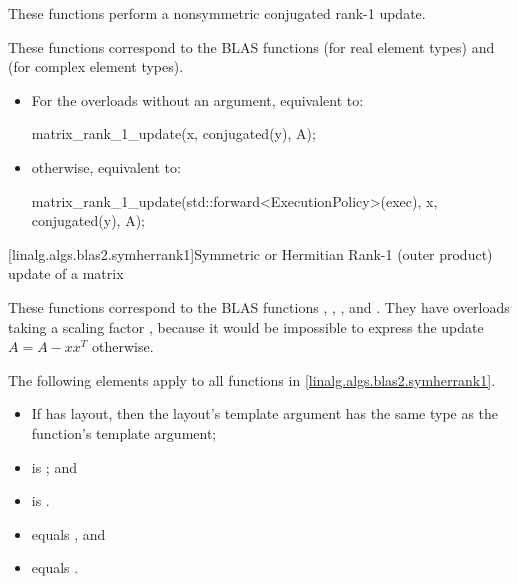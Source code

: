 \begin{itemdescr}
\pnum
These functions perform a nonsymmetric conjugated rank-1 update.
\begin{note}
These functions correspond to the BLAS functions
 (for real element types) and
 (for complex element types).
\end{note}

\pnum
\effects
\begin{itemize}
\item
For the overloads without an  argument,
equivalent to:
\begin{codeblock}
matrix_rank_1_update(x, conjugated(y), A);
\end{codeblock}
\item
otherwise, equivalent to:
\begin{codeblock}
matrix_rank_1_update(std::forward<ExecutionPolicy>(exec), x, conjugated(y), A);
\end{codeblock}
\end{itemize}
\end{itemdescr}

[linalg.algs.blas2.symherrank1]{Symmetric or Hermitian Rank-1 (outer product) update of a matrix}

\pnum
\begin{note}
These functions correspond to the BLAS functions
, , , and .
They have overloads taking a scaling factor ,
because it would be impossible to express the update
$A = A - x x^T$ otherwise.
\end{note}

\pnum
The following elements apply to all functions in \ref{linalg.algs.blas2.symherrank1}.

\pnum
\mandates
\begin{itemize}
\item
If  has  layout,
then the layout's  template argument has
the same type as the function's  template argument;
\item
{}
is ; and
\item
{}
is .
\end{itemize}

\pnum
\expects
\begin{itemize}
\item
{} equals , and
\item
{} equals .
\end{itemize}

